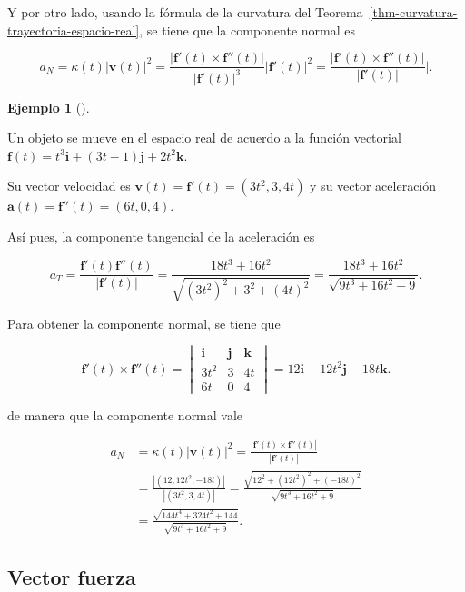 \documentclass[
  a4paper,
]{scrreport}
\theoremstyle{plain}
\theoremstyle{plain}
\theoremstyle{definition}
\theoremstyle{definition}
\newtheorem{example}{Ejemplo}[chapter]
\theoremstyle{plain}
\theoremstyle{definition}
\theoremstyle{remark}
\begin{document}
Y por otro lado, usando la fórmula de la curvatura del
Teorema~\ref{thm-curvatura-trayectoria-espacio-real}, se tiene que la
componente normal es

\[
a_N 
= \kappa(t)|\mathbf{v}(t)|^2 
= \frac{|\mathbf{f}'(t)\times \mathbf{f}''(t)|}{|\mathbf{f}'(t)|^3}|\mathbf{f}'(t)|^2
= \frac{|\mathbf{f}'(t)\times \mathbf{f}''(t)|}{|\mathbf{f}'(t)|}|.
\]

\begin{example}[]\protect\hypertarget{exm-componente-tangencial-normal-trayectoria}{}\label{exm-componente-tangencial-normal-trayectoria}

Un objeto se mueve en el espacio real de acuerdo a la función vectorial
\(\mathbf{f}(t) = t^3\mathbf{i} + (3t-1)\mathbf{j} + 2t^2 \mathbf{k}\).

Su vector velocidad es \(\mathbf{v}(t)=\mathbf{f}'(t) = (3t^2, 3, 4t)\)
y su vector aceleración \(\mathbf{a}(t) = \mathbf{f}''(t)=(6t, 0, 4)\).

Así pues, la componente tangencial de la aceleración es

\[
a_T
= \frac{\mathbf{f}'(t)\mathbf{f}''(t)}{|\mathbf{f}'(t)|}
= \frac{18t^3+16t^2}{\sqrt{(3t^2)^2 + 3^2 + (4t)^2}}
= \frac{18t^3+16t^2}{\sqrt{9t^3+16t^2+9}}.
\]

Para obtener la componente normal, se tiene que

\[
\mathbf{f}'(t)\times \mathbf{f}''(t)
=
\begin{vmatrix}
\mathbf{i} & \mathbf{j} &\mathbf{k}\\
3t^2 & 3 & 4t \\
6t & 0 & 4
\end{vmatrix}
= 12\mathbf{i}+12t^2\mathbf{j}-18t\mathbf{k}.
\]

de manera que la componente normal vale

\begin{align*}
a_N 
&= \kappa(t)|\mathbf{v}(t)|^2 
= \frac{|\mathbf{f}'(t)\times \mathbf{f}''(t)|}{|\mathbf{f}'(t)|} \\
&= \frac{|(12, 12t^2, -18t)|}{|(3t^2,3,4t)|}
= \frac{\sqrt{12^2+(12t^2)^2+(-18t)^2}}{\sqrt{9t^3+16t^2+9}} \\
&= \frac{\sqrt{144t^4+324t^2+144}}{\sqrt{9t^3+16t^2+9}}.
\end{align*}

\end{example}

\hypertarget{vector-fuerza}{%
\subsection{Vector fuerza}\label{vector-fuerza}}
\end{document}
